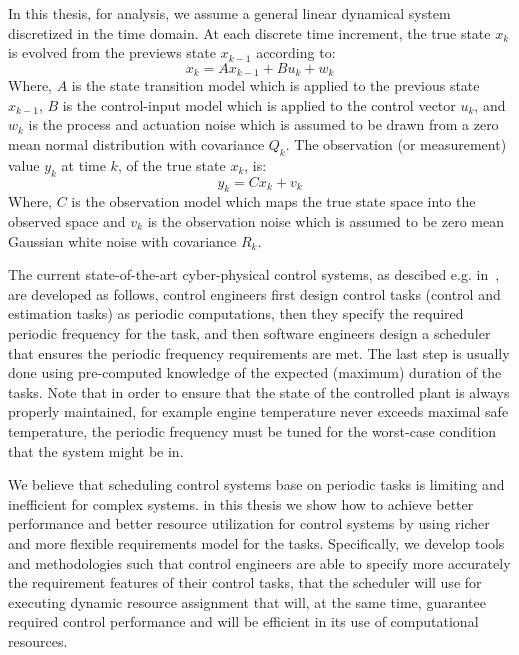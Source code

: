 \documentclass[ twoside, 12pt ]{article}
\begin{document}
In this thesis, for analysis, we assume a general linear dynamical system discretized in the time domain.
At each discrete time increment, the true state $x_k$ is evolved from the previews state $x_{k-1}$ according to:
$$ x_{k}=Ax_{k-1} + Bu_{k} + w_{k} $$
Where, $A$ is the state transition model which is applied to the previous state $x_{k-1}$, $B$ is the control-input model which is applied to the control vector $u_k$, and $w_k$ is the process and actuation noise which is assumed to be drawn from a zero mean normal distribution with covariance $Q_k$.
The observation (or measurement) value $y_k$ at time $k$, of the true state $x_k$, is:
$$y_k=Cx_k+v_k$$
Where,
$C$ is the observation model which maps the true state space into the observed space and $v_k$ is the observation noise which is assumed to be zero mean Gaussian white noise with covariance $R_k$.

The current state-of-the-art cyber-physical control systems, as descibed e.g. in~\cite{Celvin}, are developed as follows, control engineers first design control tasks (control and estimation tasks) as periodic computations, then they specify the required periodic frequency for the task, and then software engineers design a scheduler that ensures the periodic frequency requirements are met. 
The last step is usually done using pre-computed knowledge of the expected (maximum) duration of the tasks.
Note that in order to ensure that the state of the controlled plant is always properly maintained, for example engine temperature never exceeds maximal safe temperature, the periodic frequency must be tuned for the worst-case condition that the system might be in.

We believe that scheduling control systems base on periodic tasks is limiting and inefficient for complex systems.
in this thesis we show how to achieve better performance and better resource utilization for control systems by using richer and more flexible requirements model for the tasks.
Specifically, we develop tools and methodologies such that control engineers are able to specify more accurately the requirement features of their control tasks, that the scheduler will use for executing dynamic resource assignment that will, at the same time, guarantee required control performance and will be efficient in its use of computational resources. 
\end{document}
